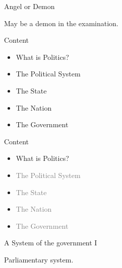 \documentclass{beamer}
\begin{document}
\begin{frame}{Angel or Demon}
\begin{minipage}{0.4\textwidth}
\begin{center}
\end{center}
\begin{center}
May be a demon in the examination.
\end{center}
\end{minipage}
\end{frame}
\begin{frame}{Content}
\begin{itemize}
\item What is Politics?
\item The Political System
\item The State
\item The Nation
\item The Government
\end{itemize}
\end{frame}
\begin{frame}{Content}
\begin{itemize}
\item What is Politics?
\item \textcolor{gray}{The Political System}
\item \textcolor{gray}{The State}
\item \textcolor{gray}{The Nation}
\item \textcolor{gray}{The Government}
\end{itemize}
\end{frame}
\begin{frame}{A System of the government I}
\begin{center}
\end{center}
\begin{center}
Parliamentary system.
\end{center}
\end{frame}
\end{document}
